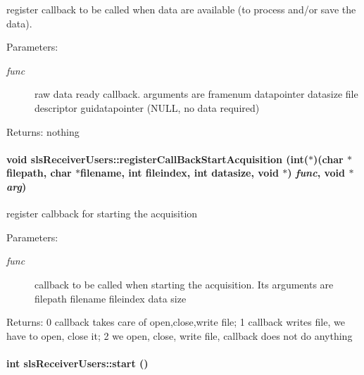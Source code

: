 register callback to be called when data are available (to process and/or save the data). \begin{Desc}
\item[Parameters:]
\begin{description}
\item[{\em func}]raw data ready callback. arguments are framenum datapointer datasize file descriptor guidatapointer (NULL, no data required) \end{description}
\end{Desc}
\begin{Desc}
\item[Returns:]nothing \end{Desc}
\hypertarget{classslsReceiverUsers_5d4bb9244008d0bc570778230d30c5e3}{
\paragraph[registerCallBackStartAcquisition]{\setlength{\rightskip}{0pt plus 5cm}void sls\-Receiver\-Users::register\-Call\-Back\-Start\-Acquisition (int($\ast$)(char $\ast$filepath, char $\ast$filename, int fileindex, int datasize, void $\ast$) {\em func}, void $\ast$ {\em arg})}\hfill}
\label{classslsReceiverUsers_5d4bb9244008d0bc570778230d30c5e3}


register calbback for starting the acquisition \begin{Desc}
\item[Parameters:]
\begin{description}
\item[{\em func}]callback to be called when starting the acquisition. Its arguments are filepath filename fileindex data size\end{description}
\end{Desc}
\begin{Desc}
\item[Returns:]0 callback takes care of open,close,write file; 1 callback writes file, we have to open, close it; 2 we open, close, write file, callback does not do anything \end{Desc}
\hypertarget{classslsReceiverUsers_ef40b4987367b8a0116bcb66534dd7b7}{
\paragraph[start]{\setlength{\rightskip}{0pt plus 5cm}int sls\-Receiver\-Users::start ()}\hfill}
\label{classslsReceiverUsers_ef40b4987367b8a0116bcb66534dd7b7}


